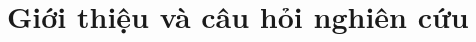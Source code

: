\documentclass[a4paper]{article}
\newif\ifPCshort
\newif\ifshowtodo
\newcommand{\TODO}[1]{\ifshowtodo\par\noindent{\small\itshape\color{black!55}[Cần viết: #1]}\par\fi}
\newcommand{\PCshortbody}{\end{document}}
\begin{document}
\tableofcontents
\newpage
\ifPCshort\expandafter\PCshortbody\fi


\section{Giới thiệu và câu hỏi nghiên cứu}

\end{document}
